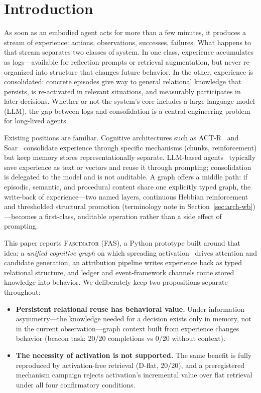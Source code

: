 \documentclass[10pt]{article}
\begin{document}
\section{Introduction}
\label{sec:intro}

As soon as an embodied agent acts for more than a few minutes, it produces a stream of experience: actions, observations, successes, failures. What happens to that stream separates two classes of system. In one class, experience accumulates as logs---available for reflection prompts or retrieval augmentation, but never re-organized into structure that changes future behavior. In the other, experience is consolidated: concrete episodes give way to general relational knowledge that persists, is re-activated in relevant situations, and measurably participates in later decisions. Whether or not the system's core includes a large language model (LLM), the gap between logs and consolidation is a central engineering problem for long-lived agents.

Existing positions are familiar. Cognitive architectures such as ACT-R~\citep{anderson2004integrated} and Soar~\citep{laird2012soar} consolidate experience through specific mechanisms (chunks, reinforcement) but keep memory stores representationally separate. LLM-based agents~\citep{yao2023react,park2023generative,shinn2023reflexion} typically save experience as text or vectors and reuse it through prompting; consolidation is delegated to the model and is not auditable. A graph offers a middle path: if episodic, semantic, and procedural content share one explicitly typed graph, the write-back of experience---two named layers, continuous Hebbian reinforcement and thresholded structural promotion (terminology note in Section~\ref{sec:arch-wb})---becomes a first-class, auditable operation rather than a side effect of prompting.

This paper reports \textsc{Fascinator} (FAS), a Python prototype built around that idea: a \emph{unified cognitive graph} on which spreading activation~\citep{collins1975spreading} drives attention and candidate generation, an attribution pipeline writes experience back as typed relational structure, and ledger and event-framework channels route stored knowledge into behavior. We deliberately keep two propositions separate throughout:

\begin{itemize}
\item[(a)] \textbf{Persistent relational reuse has behavioral value.} Under information asymmetry---the knowledge needed for a decision exists only in memory, not in the current observation---graph context built from experience changes behavior (beacon task: 20/20 completions vs 0/20 without context).
\item[(b)] \textbf{The necessity of activation is not supported.} The same benefit is fully reproduced by activation-free retrieval (D-flat, 20/20), and a preregistered mechanism campaign rejects activation's incremental value over flat retrieval under all four confirmatory conditions.
\end{itemize}
\end{document}
